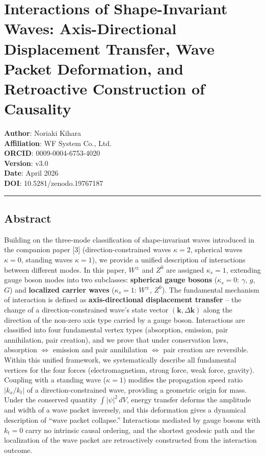 \documentclass[
  a4paper,11pt]{article}
\theoremstyle{definition}
\theoremstyle{remark}
\begin{document}
\section{Interactions of Shape-Invariant Waves: Axis-Directional
Displacement Transfer, Wave Packet Deformation, and Retroactive
Construction of
Causality}\label{interactions-of-shape-invariant-waves-axis-directional-displacement-transfer-wave-packet-deformation-and-retroactive-construction-of-causality}

\textbf{Author}: Noriaki Kihara\\
\textbf{Affiliation}: WF System Co., Ltd.\\
\textbf{ORCID}: 0009-0004-6753-4020\\
\textbf{Version}: v3.0\\
\textbf{Date}: April 2026\\
\textbf{DOI}: 10.5281/zenodo.19767187

\begin{center}\rule{0.5\linewidth}{0.5pt}\end{center}

\subsection{Abstract}\label{abstract}

Building on the three-mode classification of shape-invariant waves
introduced in the companion paper {[}3{]} (direction-constrained waves
\(\kappa = 2\), spherical waves \(\kappa = 0\), standing waves
\(\kappa = 1\)), we provide a unified description of interactions
between different modes. In this paper, \(W^{\pm}\) and \(Z^0\) are
assigned \(\kappa_s = 1\), extending gauge boson modes into two
subclasses: \textbf{spherical gauge bosons} (\(\kappa_s = 0\):
\(\gamma\), \(g\), \(G\)) and \textbf{localized carrier waves}
(\(\kappa_s = 1\): \(W^{\pm}\), \(Z^0\)). The fundamental mechanism of
interaction is defined as \textbf{axis-directional displacement
transfer} -- the change of a direction-constrained wave's state vector
\((\mathbf{k}, \Delta\mathbf{k})\) along the direction of the non-zero
axis type carried by a gauge boson. Interactions are classified into
four fundamental vertex types (absorption, emission, pair annihilation,
pair creation), and we prove that under conservation laws, absorption
\(\Leftrightarrow\) emission and pair annihilation \(\Leftrightarrow\)
pair creation are reversible. Within this unified framework, we
systematically describe all fundamental vertices for the four forces
(electromagnetism, strong force, weak force, gravity). Coupling with a
standing wave (\(\kappa = 1\)) modifies the propagation speed ratio
\(|k_x / k_t|\) of a direction-constrained wave, providing a geometric
origin for mass. Under the conserved quantity \(\int |\psi|^2 \, dV\),
energy transfer deforms the amplitude and width of a wave packet
inversely, and this deformation gives a dynamical description of ``wave
packet collapse.'' Interactions mediated by gauge bosons with
\(k_t = 0\) carry no intrinsic causal ordering, and the shortest
geodesic path and the localization of the wave packet are retroactively
constructed from the interaction outcome.
\end{document}
